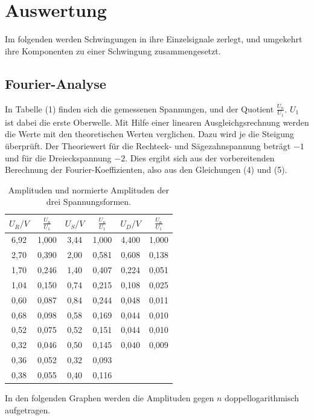 \section{Auswertung}
\label{sec:Auswertung}

Im folgenden werden Schwingungen in ihre Einzelsignale zerlegt, und umgekehrt ihre Komponenten zu einer Schwingung zusammengesetzt.

\subsection{Fourier-Analyse}
In Tabelle (1) finden sich die gemessenen Spannungen, und der Quotient $\frac{U_n}{U_1}$. $U_1$ ist dabei die erste Oberwelle. Mit Hilfe einer linearen Ausgleichgsrechnung werden die Werte mit den theoretischen
Werten verglichen. Dazu wird je die Steigung überprüft. Der Theoriewert für die Rechteck- und Sägezahnspannung beträgt $-1$ und für
die Dreieckspannung $-2$. Dies ergibt sich aus der vorbereitenden Berechnung der Fourier-Koeffizienten, also aus den Gleichungen (4) und (5).


\begin{table}[H]
  \centering
  \caption{Amplituden und normierte Amplituden der drei Spannungsformen.}
  \label{tab:Rechteckspannung}
  \begin{tabular}{c c | c c | c c}
    \toprule
    $U_R/V$ & $\frac{U_n}{U_1}$ & $U_S/V$ & $\frac{U_n}{U_1}$ & $U_D/V$ & $\frac{U_n}{U_1}$ \\
    \midrule
    6,92 & 1,000 & 3,44 & 1,000 & 4,400 &  1,000\\
    2,70 & 0,390 & 2,00 & 0,581 & 0,608 &  0,138\\
    1,70 & 0,246 & 1,40 & 0,407 & 0,224 &  0,051\\
    1,04 & 0,150 & 0,74 & 0,215 & 0,108 &  0,025\\
    0,60 & 0,087 & 0,84 & 0,244 & 0,048 &  0,011\\
    0,68 & 0,098 & 0,58 & 0,169 & 0,044 &  0,010\\
    0,52 & 0,075& 0,52 & 0,151 & 0,044 &  0,010\\
    0,32 & 0,046 & 0,50 & 0,145 & 0,040 &  0,009\\
    0,36 & 0,052& 0,32 & 0,093 \\
    0,38 & 0,055& 0,40 & 0,116 \\
    \bottomrule
  \end{tabular}
\end{table}

\noindent In den folgenden Graphen werden die Amplituden gegen $n$ doppellogarithmisch aufgetragen.

